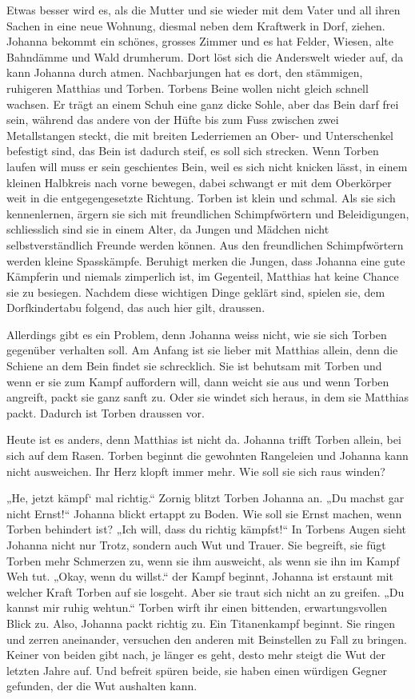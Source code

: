 \documentclass[10pt,titlepage,a5paper]{book}
\begin{document}
Etwas besser wird es, als die Mutter und sie wieder mit dem Vater und all ihren Sachen in eine neue Wohnung, diesmal neben dem Kraftwerk in Dorf, ziehen. Johanna bekommt ein schönes, grosses Zimmer und es hat Felder, Wiesen, alte Bahndämme und Wald drumherum. Dort löst sich die Anderswelt wieder auf, da kann Johanna durch atmen. Nachbarjungen hat es dort, den stämmigen, ruhigeren Matthias und Torben. Torbens Beine wollen nicht gleich schnell wachsen. Er trägt an einem Schuh eine ganz dicke Sohle, aber das Bein darf frei sein, während das andere von der Hüfte bis zum Fuss zwischen zwei Metallstangen steckt, die mit breiten Lederriemen an Ober- und Unterschenkel befestigt sind, das Bein ist dadurch steif, es soll sich strecken. Wenn Torben laufen will muss er sein geschientes Bein, weil es sich nicht knicken lässt, in einem kleinen Halbkreis nach vorne bewegen, dabei schwangt er mit dem Oberkörper weit in die entgegengesetzte Richtung. Torben ist klein und schmal. Als sie sich kennenlernen, ärgern sie sich mit freundlichen Schimpfwörtern und Beleidigungen, schliesslich sind sie in einem Alter, da Jungen und Mädchen nicht selbstverständlich Freunde werden können. Aus den freundlichen Schimpfwörtern werden kleine Spasskämpfe. Beruhigt merken die Jungen, dass Johanna eine gute Kämpferin und niemals zimperlich ist, im Gegenteil, Matthias hat keine Chance sie zu besiegen. Nachdem diese wichtigen Dinge geklärt sind, spielen sie, dem Dorfkindertabu folgend, das auch hier gilt, draussen. 

Allerdings gibt es ein Problem, denn Johanna weiss nicht, wie sie sich Torben gegenüber verhalten soll. Am Anfang ist sie lieber mit Matthias allein, denn die Schiene an dem Bein findet sie schrecklich. Sie ist behutsam mit Torben und wenn er sie zum Kampf auffordern will, dann weicht sie aus und wenn Torben angreift, packt sie ganz sanft zu. Oder sie windet sich heraus, in dem sie Matthias packt. Dadurch ist Torben draussen vor.

Heute ist es anders, denn Matthias ist nicht da. Johanna trifft Torben allein, bei sich auf dem Rasen. Torben beginnt die gewohnten Rangeleien und Johanna kann nicht ausweichen. Ihr Herz klopft immer mehr. Wie soll sie sich raus winden? 

„He, jetzt kämpf` mal richtig.“ Zornig blitzt Torben Johanna an. „Du machst gar nicht Ernst!“ Johanna blickt ertappt zu Boden. Wie soll sie Ernst machen, wenn Torben behindert ist? „Ich will, dass du richtig kämpfst!“ In Torbens Augen sieht Johanna nicht nur Trotz, sondern auch Wut und Trauer. Sie begreift, sie fügt Torben mehr Schmerzen zu, wenn sie ihm ausweicht, als wenn sie ihn im Kampf Weh tut. „Okay, wenn du willst.“ der Kampf beginnt, Johanna ist erstaunt mit welcher Kraft Torben auf sie losgeht. Aber sie traut sich nicht an zu greifen. „Du kannst mir ruhig wehtun.“ Torben wirft ihr einen bittenden, erwartungsvollen Blick zu. Also, Johanna packt richtig zu. Ein Titanenkampf beginnt. Sie ringen und zerren aneinander, versuchen den anderen mit Beinstellen zu Fall zu bringen. Keiner von beiden gibt nach, je länger es geht, desto mehr steigt die Wut der letzten Jahre auf. Und befreit spüren beide, sie haben einen würdigen Gegner gefunden, der die Wut aushalten kann.
\end{document}
